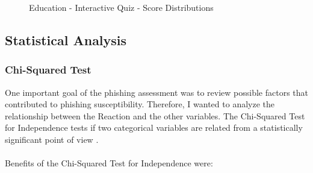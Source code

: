 \documentclass[a4paper]{article}
\begin{document}
\begin{figure}[H]
	\centering
	\caption{Education - Interactive Quiz - Score Distributions}
	\label{edu-quiz-score}
\end{figure}

\newpage

\subsection{Statistical Analysis}

\subsubsection{Chi-Squared Test}

One important goal of the phishing assessment was to review possible factors that contributed to phishing susceptibility. Therefore, I wanted to analyze the relationship between the Reaction and the other variables. The Chi-Squared Test for Independence tests if two categorical variables are related from a statistically significant point of view \cite{stats-chi-squared}. 
\\ \\
Benefits of the Chi-Squared Test for Independence were:
\end{document}
